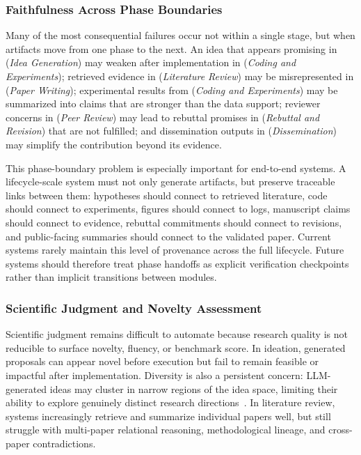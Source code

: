 \subsubsection{Faithfulness Across Phase Boundaries}

Many of the most consequential failures occur not within a single stage, but when artifacts move from one phase to the next. An idea that appears promising in \Sone (\emph{Idea Generation}) may weaken after implementation in \Sthree (\emph{Coding and Experiments}); retrieved evidence in \Stwo (\emph{Literature Review}) may be misrepresented in \Sfive (\emph{Paper Writing}); experimental results from \Sthree (\emph{Coding and Experiments}) may be summarized into claims that are stronger than the data support; reviewer concerns in \Ssix (\emph{Peer Review}) may lead to rebuttal promises in \Sseven (\emph{Rebuttal and Revision}) that are not fulfilled; and dissemination outputs in \Seight (\emph{Dissemination}) may simplify the contribution beyond its evidence.

This phase-boundary problem is especially important for end-to-end systems. A lifecycle-scale system must not only generate artifacts, but preserve traceable links between them: hypotheses should connect to retrieved literature, code should connect to experiments, figures should connect to logs, manuscript claims should connect to evidence, rebuttal commitments should connect to revisions, and public-facing summaries should connect to the validated paper. Current systems rarely maintain this level of provenance across the full lifecycle. Future systems should therefore treat phase handoffs as explicit verification checkpoints rather than implicit transitions between modules.


\subsubsection{Scientific Judgment and Novelty Assessment}

Scientific judgment remains difficult to automate because research quality is not reducible to surface novelty, fluency, or benchmark score. In ideation, generated proposals can appear novel before execution but fail to remain feasible or impactful after implementation. Diversity is also a persistent concern: LLM-generated ideas may cluster in narrow regions of the idea space, limiting their ability to explore genuinely distinct research directions~\cite{jiang2025artificialhivemind}. In literature review, systems increasingly retrieve and summarize individual papers well, but still struggle with multi-paper relational reasoning, methodological lineage, and cross-paper contradictions.

